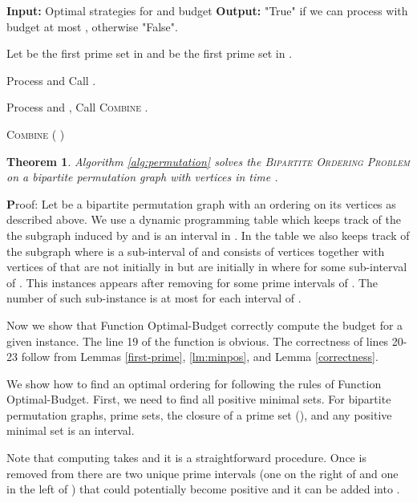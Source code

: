 \documentclass[letterpaper,11pt,abstracton]{scrartcl}
\newcommand{\pf}{{\textbf Proof: }}
\newtheorem{tm}[theorem]{Theorem}
\begin{document}
\begin{algorithm}[H]
\begin{algorithmic}[1]
\State \textbf{Input:} Optimal strategies for  and budget \;
\State \textbf{Output:} "True" if we can process  with budget at most , otherwise "False".\;

\State Let  be the first prime set in  and  be the first prime set in .

	\State Process  and 
       \State Call .


\Else{}  \State Process  and ,
         \State Call \textsc{Combine} .

\EndIf


\end{algorithmic}
\caption{{\textsc{Combine}} ( )}
\label{combine}
\end{algorithm}

\begin{tm}\label{thm:poly-permutation}
Algorithm \ref{alg:permutation} solves the \textsc{Bipartite Ordering Problem} on a bipartite permutation graph with 
 vertices in time . 
\end{tm}
\pf Let  be a bipartite permutation graph with an ordering on its vertices
as described above. We use a dynamic programming table which keeps track of the the subgraph  induced by  and 
 is an interval in . In the table we also keeps track of the subgraph  where  is a sub-interval of 
and  consists of vertices  together with vertices of  that are not initially in  but are initially in 
 where  for some sub-interval  of . This instances appears after removing  for some prime 
intervals  of . The number of such sub-instance is at most  for each interval  of . 

Now we show that Function Optimal-Budget correctly compute the budget for a given instance. 
The line 19 of the function is obvious. The correctness of lines 20-23 follow from Lemmas \ref{first-prime}, \ref{lm:minpos}, and 
Lemma \ref{correctness}.  



We show how to find an optimal ordering for  following the rules of Function Optimal-Budget.
First, we need to find all positive minimal sets. For bipartite permutation graphs, prime sets, the closure of a prime set (), 
and any positive minimal set is an interval.  

Note that computing  takes  and it is a straightforward procedure. Once  is removed from  there are two 
unique prime intervals (one on the right of  and one in the left of ) that could potentially become positive and it can be added into .  
\end{document}
